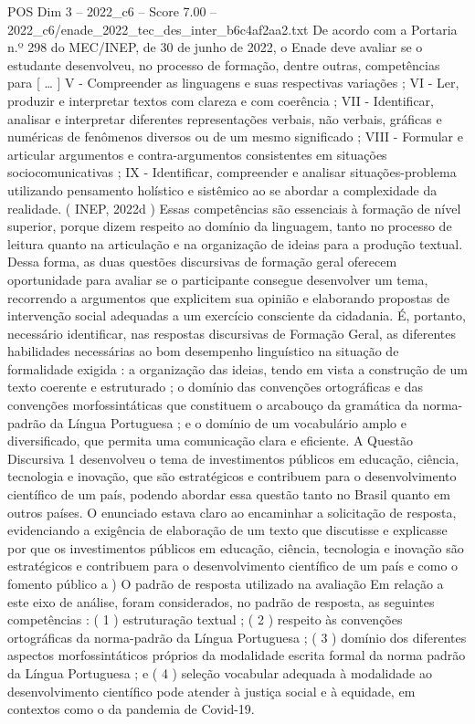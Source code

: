 \begin{textsample}{POS Dim 3 – 2022\_c6 – Score 7.00 – 2022\_c6/enade\_2022\_tec\_des\_inter\_b6c4af2aa2.txt}
De acordo com a Portaria n.º 298 do MEC/INEP, de 30 de junho de 2022, o Enade deve avaliar se o estudante desenvolveu, no processo de formação, dentre outras, competências para [ … ] V - Compreender as linguagens e suas respectivas variações ; VI - Ler, produzir e interpretar textos com clareza e com coerência ; VII - Identificar, analisar e interpretar diferentes representações verbais, não verbais, gráficas e numéricas de fenômenos diversos ou de um mesmo significado ; VIII - Formular e articular argumentos e contra-argumentos consistentes em situações sociocomunicativas ; IX - Identificar, compreender e analisar situações-problema utilizando pensamento holístico e sistêmico ao se abordar a complexidade da realidade. ( INEP, 2022d ) Essas competências são essenciais à formação de nível superior, porque dizem respeito ao domínio da linguagem, tanto no processo de leitura quanto na articulação e na organização de ideias para a produção textual.
Dessa forma, as duas questões discursivas de formação geral oferecem oportunidade para avaliar se o participante consegue desenvolver um tema, recorrendo a argumentos que explicitem sua opinião e elaborando propostas de intervenção social adequadas a um exercício consciente da cidadania.
É, portanto, necessário identificar, nas respostas discursivas de Formação Geral, as diferentes habilidades necessárias ao bom desempenho linguístico na situação de formalidade exigida : a organização das ideias, tendo em vista a construção de um texto coerente e estruturado ; o domínio das convenções ortográficas e das convenções morfossintáticas que constituem o arcabouço da gramática da norma-padrão da Língua Portuguesa ; e o domínio de um vocabulário amplo e diversificado, que permita uma comunicação clara e eficiente.
A Questão Discursiva 1 desenvolveu o tema de investimentos públicos em educação, ciência, tecnologia e inovação, que são estratégicos e contribuem para o desenvolvimento científico de um país, podendo abordar essa questão tanto no Brasil quanto em outros países.
O enunciado estava claro ao encaminhar a solicitação de resposta, evidenciando a exigência de elaboração de um texto que discutisse e explicasse por que os investimentos públicos em educação, ciência, tecnologia e inovação são estratégicos e contribuem para o desenvolvimento científico de um país e como o fomento público a ) O padrão de resposta utilizado na avaliação Em relação a este eixo de análise, foram considerados, no padrão de resposta, as seguintes competências : ( 1 ) estruturação textual ; ( 2 ) respeito às convenções ortográficas da norma-padrão da Língua Portuguesa ; ( 3 ) domínio dos diferentes aspectos morfossintáticos próprios da modalidade escrita formal da norma padrão da Língua Portuguesa ; e ( 4 ) seleção vocabular adequada à modalidade ao desenvolvimento científico pode atender à justiça social e à equidade, em contextos como o da pandemia de Covid-19.

\end{textsample}
